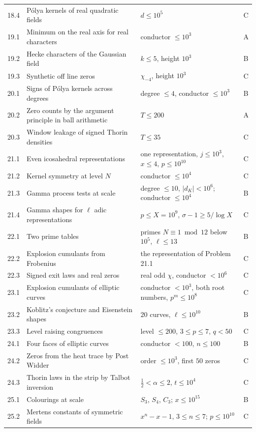 {\begin{longtable}{p{0.9cm}p{5.3cm}p{3.0cm}p{0.5cm}}
18.4 & P\'olya kernels of real quadratic fields & $d\le10^5$ & C\\
19.1 & Minimum on the real axis for real characters & conductor $\le10^3$ & A\\
19.2 & Hecke characters of the Gaussian field & $k\le5$, height $10^3$ & B\\
19.3 & Synthetic off line zeros & $\chi_{-4}$, height $10^3$ & C\\
20.1 & Signs of P\'olya kernels across degrees & degree $\le4$, conductor $\le10^3$ & B\\
20.2 & Zero counts by the argument principle in ball arithmetic & $T\le200$ & A\\
20.3 & Window leakage of signed Thorin densities & $T\le35$ & C\\
21.1 & Even icosahedral representations & one representation, $j\le10^3$, $x\le4$, $p\le10^{10}$ & C\\
21.2 & Kernel symmetry at level $N$ & conductor $\le10^4$ & C\\
21.3 & Gamma process tests at scale & degree $\le10$, $|d_K|<10^6$; conductor $\le10^4$ & B\\
21.4 & Gamma shapes for $\ell$ adic representations & $p\le X=10^9$, $\sigma-1\ge5/\log X$ & C\\
22.1 & Two prime tables & primes $N\equiv1\bmod12$ below $10^5$, $\ell\le13$ & B\\
22.2 & Explosion cumulants from Frobenius & the representation of Problem 21.1 & C\\
22.3 & Signed exit laws and real zeros & real odd $\chi$, conductor $<10^6$ & C\\
23.1 & Explosion cumulants of elliptic curves & conductor $<10^3$, both root numbers, $p^m\le10^8$ & C\\
23.2 & Koblitz's conjecture and Eisenstein shapes & $20$ curves, $\ell\le10^{10}$ & B\\
23.3 & Level raising congruences & level $\le200$, $3\le p\le7$, $q<50$ & C\\
24.1 & Four faces of elliptic curves & conductor $<100$, $n\le100$ & B\\
24.2 & Zeros from the heat trace by Post Widder & order $\le10^3$, first $50$ zeros & C\\
24.3 & Thorin laws in the strip by Talbot inversion & $\tfrac12<\alpha\le2$, $t\le10^4$ & C\\
25.1 & Colourings at scale & $S_3$, $S_4$, $C_3$; $x\le10^{15}$ & B\\
25.2 & Mertens constants of symmetric fields & $x^n-x-1$, $3\le n\le7$; $p\le10^{10}$ & C\\

\end{longtable}}
